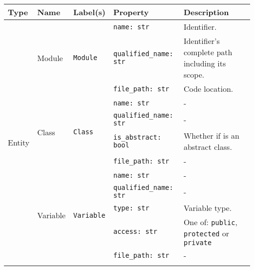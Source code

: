 \begin{table*}[h]
\centering
\begin{threeparttable}
\begin{tabular}{|p{1.6cm}||p{1.7cm}|p{2cm}|p{3.3cm}|p{7.5cm}|}

\hline
\textbf{Type} & \textbf{Name} & \textbf{Label(s)} & \textbf{Property} & \textbf{Description} \\
\hline

\multirow{23}{*}{Entity} & \multirow{3}{*}{Module}  & \multirow{3}{*}{\texttt{Module}} & \texttt{name: str}             & Identifier. \\ \cline{4-5}
                        &                           &                                   & \texttt{qualified\_name: str}  & Identifier's complete path including its scope. \\ \cline{4-5}
                        &                           &                                   & \texttt{file\_path: str}       & Code location. \\ \cline{2-5}

                        & \multirow{4}{*}{Class}    & \multirow{4}{*}{\texttt{Class}}   & \texttt{name: str}             & - \\ \cline{4-5}
                        &                           &                                   & \texttt{qualified\_name: str}  & - \\ \cline{4-5}
                        &                           &                                   & \texttt{is\_abstract: bool}    & Whether if is an abstract class. \\ \cline{4-5}
                        &                           &                                   & \texttt{file\_path: str}       & - \\ \cline{2-5}

                        & \multirow{5}{*}{Variable} & \multirow{5}{*}{\texttt{Variable}} & \texttt{name: str}            & - \\ \cline{4-5}
                        &                           &                                   & \texttt{qualified\_name: str}  & - \\ \cline{4-5}
                        &                           &                                   & \texttt{type: str}             & Variable type. \\ \cline{4-5}
                        &                           &                                   & \texttt{access: str}           & One of: \texttt{public}, \texttt{protected} or \texttt{private} \\ \cline{4-5}
                        &                           &                                   & \texttt{file\_path: str}       & - \\ \cline{2-5}
                        

\end{tabular}
\end{threeparttable}
\end{table*}
